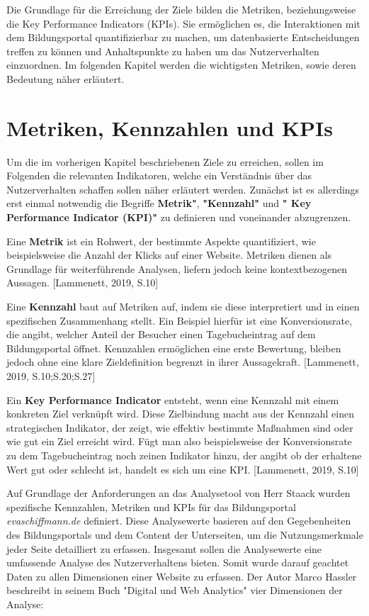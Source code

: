 Die Grundlage für die Erreichung der Ziele bilden die Metriken, beziehungsweise die Key Performance Indicators (KPIs). Sie ermöglichen es, die Interaktionen mit dem Bildungsportal quantifizierbar zu machen, um datenbasierte Entscheidungen treffen zu können und Anhaltspunkte zu haben um das Nutzerverhalten einzuordnen. Im folgenden Kapitel werden die wichtigsten Metriken, sowie deren Bedeutung näher erläutert.

\section{Metriken, Kennzahlen und KPIs} %
\label{sec:kpis}
Um die im vorherigen Kapitel beschriebenen Ziele zu erreichen, sollen im Folgenden die relevanten Indikatoren, welche ein Verständnis über das Nutzerverhalten schaffen sollen näher erläutert werden. Zunächst ist es allerdings erst einmal notwendig die Begriffe \textbf{ Metrik"}, \textbf{"Kennzahl"} und \textbf{" Key Performance Indicator (KPI)"} zu definieren und voneinander abzugrenzen.

Eine \textbf{Metrik} ist ein Rohwert, der bestimmte Aspekte quantifiziert, wie beispielsweise die Anzahl der Klicks auf einer Website. Metriken dienen als Grundlage für weiterführende Analysen, liefern jedoch keine kontextbezogenen Aussagen. [Lammenett, 2019, S.10]

Eine \textbf{Kennzahl} baut auf Metriken auf, indem sie diese interpretiert und in einen spezifischen Zusammenhang stellt. Ein Beispiel hierfür ist eine Konversionsrate, die angibt, welcher Anteil der Besucher einen Tagebucheintrag auf dem Bildungsportal öffnet. Kennzahlen ermöglichen eine erste Bewertung, bleiben jedoch ohne eine klare Zieldefinition begrenzt in ihrer Aussagekraft. [Lammenett, 2019, S.10;S.20;S.27]

Ein \textbf{Key Performance Indicator} entsteht, wenn eine Kennzahl mit einem konkreten Ziel verknüpft wird. Diese Zielbindung macht aus der Kennzahl einen strategischen Indikator, der zeigt, wie effektiv bestimmte Maßnahmen sind oder wie gut ein Ziel erreicht wird. Fügt man also beispielsweise der Konversionsrate zu dem Tagebucheintrag noch zeinen Indikator hinzu, der angibt ob der erhaltene Wert gut oder schlecht ist, handelt es sich um eine KPI. [Lammenett, 2019, S.10]

Auf Grundlage der Anforderungen an das Analysetool von Herr Staack wurden spezifische Kennzahlen, Metriken und KPIs für das Bildungsportal \textit{evaschiffmann.de} definiert. Diese Analysewerte basieren auf den Gegebenheiten des Bildungsportals und dem Content der Unterseiten, um die Nutzungsmerkmale jeder Seite detailliert zu erfassen. Insgesamt sollen die Analysewerte eine umfassende Analyse des Nutzerverhaltens bieten. Somit wurde darauf geachtet Daten zu allen Dimensionen einer Website zu erfassen. Der Autor Marco Hassler beschreibt in seinem Buch "Digital und Web Analytics" vier Dimensionen der Analyse: 

